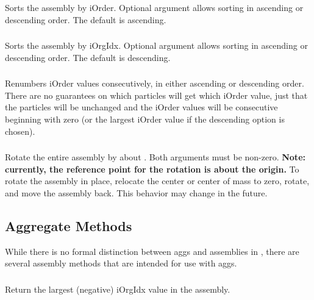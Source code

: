 \subsubsection{}
Sorts the assembly by iOrder. Optional  argument allows sorting in ascending  or descending  order. The default is ascending.

\subsubsection{}
Sorts the assembly by iOrgIdx. Optional  argument allows sorting in ascending  or descending  order. The default is descending.

\subsubsection{}
Renumbers iOrder values consecutively, in either ascending  or descending  order. There are no guarantees on which particles will get which iOrder value, just that the particles will be unchanged and the iOrder values will be consecutive beginning with zero (or the largest iOrder value if the descending option is chosen).

\subsubsection{}
Rotate the entire assembly by  about . Both arguments must be non-zero. \textbf{Note: currently, the reference point for the rotation is about the origin.} To rotate the assembly in place, relocate the center or center of mass to zero, rotate, and move the assembly back. This behavior may change in the future.

\subsection{Aggregate Methods}

While there is no formal distinction between aggs and assemblies in , there are several assembly methods that are intended for use with aggs.

\subsubsection{}
Return the largest (negative) iOrgIdx value in the assembly.

